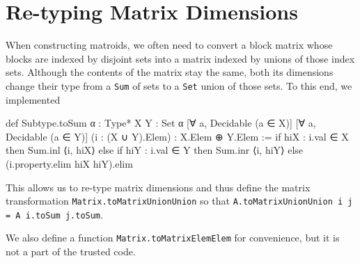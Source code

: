 \section{Re-typing Matrix Dimensions}

When constructing matroids, we often need to convert a block matrix whose blocks are indexed by disjoint sets into a matrix indexed by unions of those index sets. Although the contents of the matrix stay the same, both its dimensions change their type from a \texttt{Sum} of sets to a \texttt{Set} union of those sets. To this end, we implemented
\begin{leancode}
def Subtype.toSum {α : Type*} {X Y : Set α}
    [∀ a, Decidable (a ∈ X)]
    [∀ a, Decidable (a ∈ Y)]
    (i : (X ∪ Y).Elem) :
    X.Elem ⊕ Y.Elem :=
  if hiX : i.val ∈ X then Sum.inl ⟨i, hiX⟩ else
  if hiY : i.val ∈ Y then Sum.inr ⟨i, hiY⟩ else
  (i.property.elim hiX hiY).elim
\end{leancode}
This allows us to re-type matrix dimensions and thus define the matrix transformation \texttt{Matrix.toMatrixUnionUnion} so that \texttt{A.toMatrixUnionUnion i j = A i.toSum j.toSum}.

We also define a function \texttt{Matrix.toMatrixElemElem} for convenience, but it is not a part of the trusted code.

